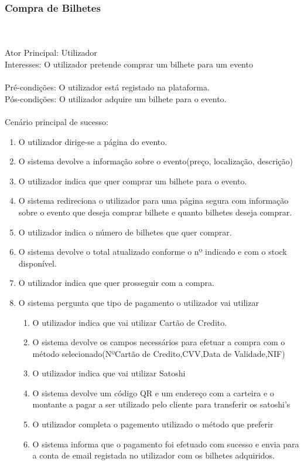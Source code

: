 \documentclass[12pt, a4paper, twoside]{report} %
\begin{document}
\subsubsection{Compra de Bilhetes}
\\
\\
Ator Principal: Utilizador
\\
Interesses: O utilizador pretende comprar um bilhete para um evento
\\
\\
Pré-condições: O utilizador está registado na plataforma.
\\
Pós-condições: O utilizador adquire um bilhete para o evento.
\\
\\
Cenário principal de sucesso:
\begin{enumerate}

\item O utilizador dirige-se a página do evento.
\item O sistema devolve a informação sobre o evento(preço, localização, descrição)
\item O utilizador indica que quer comprar um bilhete para o evento.
\item O sistema redireciona o utilizador para uma página segura com informação sobre o evento que deseja comprar bilhete e quanto bilhetes deseja comprar.
\item O utilizador indica o número de bilhetes que quer comprar.
\item O sistema devolve o total atualizado conforme o nº indicado e com o stock disponível.
\item O utilizador indica que quer prosseguir com a compra.
\item O sistema pergunta que tipo de pagamento o utilizador vai utilizar
\begin{enumerate}
\item O utilizador indica que vai utilizar Cartão de Credito.
\item O sistema devolve os campos necessários para efetuar a compra com o método selecionado(NºCartão de Credito,CVV,Data de Validade,NIF)
\item O utilizador indica que vai utilizar Satoshi
\item O sistema devolve um código QR e um endereço com a carteira e o montante a pagar a ser utilizado pelo cliente para transferir os satoshi’s
\item O utilizador completa o pagemento utilizado o método que preferir
\item O sistema informa que o pagamento foi efetuado com sucesso e envia para a conta de email registada no utilizador com os bilhetes adquiridos.
\end{enumerate}
\end{enumerate}
\end{document}
